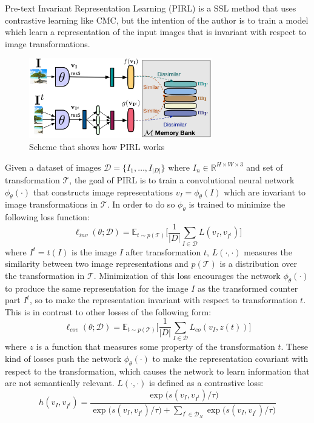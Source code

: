 Pre-text Invariant Representation Learning (PIRL) \cite{misra2020self} is a SSL method that uses contrastive learning like CMC, but the intention of the author is to train a model which learn a representation of the input images that is invariant with respect to image transformations.
\begin{figure}[H]
	\centering
	\includegraphics[width=8cm]{./images/pirl_scheme.png}
	\caption{Scheme that shows how PIRL works}
	\label{fig:pirl_scheme}
\end{figure}
\noindent Given a dataset of images $\mathcal{D} = \{I_1, \dots ,I_{|D|}\}$ where $I_n \in \mathbb{R}^{H\times W\times3}$ and set of transformation $\mathcal{T}$, the goal of PIRL is to train a convolutional neural network $\phi_\theta(\cdot)$ that constructs image representations $v_I = \phi_\theta(I)$ which are invariant to image transformations in $\mathcal{T}$. In order to do so $\phi_\theta$ is trained to minimize the following loss function:
\[ \ell_{inv}(\theta;\mathcal{D}) = \mathbb{E}_{t \sim p(\mathcal{T})}\Bigg[ \frac{1}{|D|} \sum_{I \in \mathcal{D}} L(v_I, v_{I^t}) \Bigg] \]
where $I^t = t(I)$ is the image $I$ after transformation $t$,  $L(\cdot, \cdot)$ measures the similarity between two image representations and $p(\mathcal{T})$ is a distribution over the transformation in $\mathcal{T}$. Minimization of this loss encourages the network $\phi_\theta(\cdot)$ to produce the same representation for the image $I$ as the transformed counter part $I^t$, so to make the representation invariant with respect to transformation $t$. This is in contrast to other losses of the following form:
\[ \ell_{cov}(\theta;\mathcal{D}) = \mathbb{E}_{t \sim p(\mathcal{T})}\Bigg[ \frac{1}{|D|} \sum_{I \in \mathcal{D}} L_{co}(v_I, z(t)) \Bigg] \]
where $z$ is a function that measures some property of the transformation $t$. These kind of losses push the network $\phi_\theta(\cdot)$ to make the representation covariant with respect to the transformation, which causes the network to learn information that are not semantically relevant.
$L(\cdot, \cdot)$ is defined as a contrastive loss:
\[h(v_I, v_{I^t}) = \frac{ \exp\Big(s(v_I, v_{I^t})/\tau \Big)}{ \exp\Big(s(v_I, v_{I^t})/\tau\Big) + \sum_{I^\prime \in \mathcal{D}_N}\exp\Big(s(v_I, v_{I^\prime})/\tau\Big)}\]
